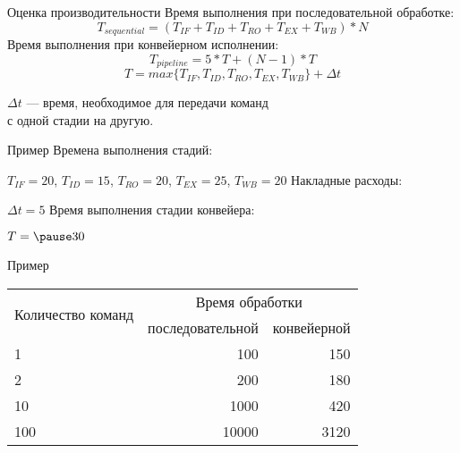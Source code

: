 \begin{frame}{Оценка производительности}
Время выполнения при последовательной обработке:
\begin{displaymath}
T_{sequential} = (T_{IF} + T_{ID} + T_{RO} + T_{EX} + T_{WB}) * N
\end{displaymath}
\vfill\pause
Время выполнения при конвейерном исполнении:
\begin{displaymath}
T_{pipeline} = 5 * T + (N - 1) * T
\end{displaymath}
\begin{displaymath}
T = max \{T_{IF}, T_{ID}, T_{RO}, T_{EX}, T_{WB}\} + \Delta t
\end{displaymath}
\begin{center}
$\Delta t$ --- время, необходимое для передачи команд\\с одной стадии на другую.
\end{center}
\end{frame}

\begin{frame}{Пример}
Времена выполнения стадий:

$T_{IF} = 20$, $T_{ID} = 15$, $T_{RO} = 20$, $T_{EX} = 25$, $T_{WB} = 20$
\vfill
Накладные расходы:

$\Delta t = 5$
\vfill
Время выполнения стадии конвейера:

$T = \pause30$
\end{frame}

\begin{frame}{Пример}
\begin{table}[htpb]
    \centering
    \begin{tabular}{|l|r|r|}
    \hline
    \multirow{2}{*}{Количество команд}   &   \multicolumn{2}{c|}{Время обработки}    \\
    \cline{2-3}
                        &   последовательной    &   конвейерной     \\
    \hline
    1                   &   100                 &   150             \\
    \hline
    2                   &   200                 &   180             \\
    \hline
    10                  &   1000                &   420             \\
    \hline
    100                 &   10000               &   3120            \\
    \hline
    \end{tabular}
\end{table}
\end{frame}

